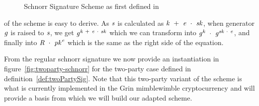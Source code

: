\begin{figure}
    \begin{center}
        \fbox{
        \begin{varwidth}{\textwidth}
            \procedure[linenumbering]{$\procSetup{\varSecParam}$} {
            \varKey \sample \cnstIntegersPrimeWithoutZero{\varPrime} \\
            \pcreturn (\varSecKey \opAssign \varKey \opSeperate \varPubKey \opAssign \funGen{\varKey})
            }
            \procedure[linenumbering]{$\procSign{\varMsg}{\varSecKey}$}{
            \varNonce \sample \cnstIntegersPrimeWithoutZero{\varPrime} \\
            \varRand \opAssign \funGen{\varNonce} \\
            \varSchnorrChallenge \opAssign \funHash{\varMsg \opConc \varRand \opConc \varPubKey} \\
            \varS \opAssign \varNonce \opAddScalar \varSchnorrChallenge \opTimesScalar \varSecKey \\
            \pcreturn \varSignature \opAssign (\varS, \varRand)
            }
            \procedure[linenumbering]{$\procVerf{\varMsg}{\varSignature}{\varPubKey}$} {
            (\varS \opSeperate \varRand) \opFunResult \varSignature \\
            \varSchnorrChallenge \opAssign \funHash{\varMsg \opConc \varRand \opConc \varPubKey} \\
            \pcreturn \funGen{\varS} \opEq \varRand \opAddPoint \opPointScalar{\varPubKey}{\varSchnorrChallenge}
            }
        \end{varwidth}
        }
    \end{center}
    \caption{Schnorr Signature Scheme as first defined in~\cite{schnorr1989efficient}}
    \label{fig:schnorr}
\end{figure}
\cnstCorrectness of the scheme is easy to derive. As $\mathit{s}$ is calculated as $\mathit{k} ~+~ \mathit{e} ~\cdot~ \mathit{sk}$, when generator $\mathit{g}$ is raised to $\mathit{s}$, we get
$\mathit{g}^{\mathit{k} ~+~ \mathit{e} ~\cdot~ \mathit{sk}}$ which we can transform into $\mathit{g}^{\mathit{k}} ~\cdot~ \mathit{g}^{\mathit{sk} ~\cdot~ \mathit{e}}$, and finally
into $\mathit{R} ~\cdot~ \mathit{pk}^{\mathit{e}}$ which is the same as the right side of the equation.

From the regular schnorr signature we now provide an instantiation in figure~\ref{fig:twoparty-schnorr} for the two-party case defined in definition~\ref{def:twoPartySig}. Note that this two-party variant of the scheme is what is
currently implemented in the Grin mimblewimble cryptocurrency and will provide a basis from which we will build our adapted scheme.

